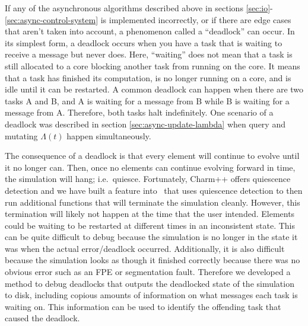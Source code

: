 \begin{bibunit}[unsrtnat]
If any of the asynchronous algorithms described above in sections
\ref{sec:io}-\ref{sec:async-control-system} is implemented incorrectly, or if
there are edge cases that aren't taken into account, a phenomenon called a
``deadlock'' can occur. In its simplest form, a deadlock occurs when you have a
task that is waiting to receive a message but never does. Here, ``waiting'' does
not mean that a task is still allocated to a core blocking another task from
running on the core. It means that a task has finished its computation, is no
longer running on a core, and is idle until it can be restarted. A common
deadlock can happen when there are two tasks A and B, and A is waiting for a
message from B while B is waiting for a message from A. Therefore, both tasks
halt indefinitely. One scenario of a deadlock was described in section
\ref{sec:async-update-lambda} when query and mutating $\Lambda(t)$ happen
simultaneously.

The consequence of a deadlock is that every element will continue to evolve
until it no longer can. Then, once no elements can continue evolving forward in
time, the simulation will hang; i.e.~quiesce. Fortunately, Charm++ offers
quiescence detection and we have built a feature into \spectre~that uses
quiescence detection to then run additional functions that will terminate the
simulation cleanly. However, this termination will likely not happen at the time
that the user intended. Elements could be waiting to be restarted at different
times in an inconsistent state. This can be quite difficult to debug because the
simulation is no longer in the state it was when the actual error/deadlock
occurred. Additionally, it is also difficult because the simulation looks as
though it finished correctly because there was no obvious error such as an FPE
or segmentation fault. Therefore we developed a method to debug deadlocks that
outputs the deadlocked state of the simulation to disk, including copious
amounts of information on what messages each task is waiting on. This
information can be used to identify the offending task that caused the
deadlock.
  

\end{bibunit}
